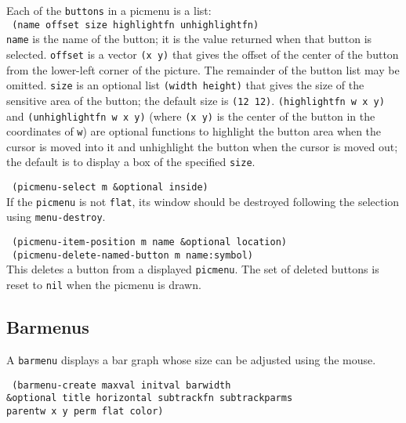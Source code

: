 Each of the {\tt buttons} in a picmenu is a list: \\

\vspace{-0.1in}
{\tt \hspace*{0.5in} (name offset size highlightfn unhighlightfn)} \\

\vspace{-0.1in}
{\tt name} is the name of the button; it is the value returned when that
button is selected.
{\tt offset} is a vector {\tt (x y)} that gives the offset of the center
of the button from the lower-left corner of the picture.
The remainder of the button list may be omitted.
{\tt size} is an optional list {\tt (width height)} that gives the size of the
sensitive area of the button; the default size is {\tt (12\ 12)}.
{\tt (highlightfn w x y)} and {\tt (unhighlightfn w x y)} (where {\tt (x y)}
is the center of the button in the coordinates of {\tt w}) are optional
functions to highlight the button area when the cursor is moved into it and
unhighlight the button when the cursor is moved out; the default is to
display a box of the specified {\tt size}.

{\tt \hspace*{0.5in} (picmenu-select m \&optional inside)} \\
If the {\tt picmenu} is not {\tt flat}, its window should be destroyed
following the selection using {\tt menu-destroy}.

{\tt \hspace*{0.5in} (picmenu-item-position m name \&optional location)} \\

\vspace{-0.1in}
{\tt \hspace*{0.5in} (picmenu-delete-named-button m name:symbol)} \\
This deletes a button from a displayed {\tt picmenu}.  The set of
deleted buttons is reset to {\tt nil} when the picmenu is drawn.

\subsection{Barmenus}

A {\tt barmenu} displays a bar graph whose size can be adjusted using
the mouse.

{\tt \hspace*{0.5in} 
(barmenu-create maxval initval barwidth \\
\hspace*{1.5in} \&optional title horizontal subtrackfn subtrackparms \\
\hspace*{1.5in} parentw x y perm flat color)}

